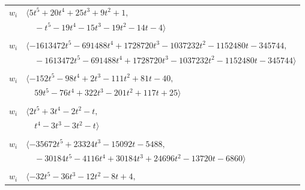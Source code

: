 \documentclass[11pt]{article}
\begin{document}
\begin{longtable}{@{}ll@{}}
$w_i$ & $\langle 5t^{5}+20t^{4}+25t^{3}+9t^{2}+1,$\\
 & $\quad -t^{5}-19t^{4}-15t^{3}-19t^{2}-14t-4\rangle$\\
\addlinespace[2pt]
\multicolumn{2}{@{}p{0.97\textwidth}@{}}{$i=11$, $D_i=19208$, $\rho_{ij}$: $4{:}2, \allowbreak 5{:}1, \allowbreak 9{:}1, \allowbreak 13{:}1, \allowbreak 19{:}1, \allowbreak 22{:}1, \allowbreak 23{:}1, \allowbreak 27{:}2, \allowbreak 28{:}2, \allowbreak 30{:}1, \allowbreak 35{:}1, \allowbreak 44{:}1, \allowbreak 45{:}1$}\\
$w_i$ & $\langle -1613472t^{5}-691488t^{4}+1728720t^{3}-1037232t^{2}-1152480t-345744,$\\
 & $\quad -1613472t^{5}-691488t^{4}+1728720t^{3}-1037232t^{2}-1152480t-345744\rangle$\\
\addlinespace[2pt]
\multicolumn{2}{@{}p{0.97\textwidth}@{}}{$i=12$, $D_i=1$, $\rho_{ij}$: $4{:}2, \allowbreak 5{:}2, \allowbreak 8{:}1, \allowbreak 9{:}2, \allowbreak 13{:}2, \allowbreak 25{:}2, \allowbreak 26{:}1, \allowbreak 27{:}1, \allowbreak 28{:}1, \allowbreak 40{:}1, \allowbreak 52{:}1$}\\
$w_i$ & $\langle -152t^{5}-98t^{4}+2t^{3}-111t^{2}+81t-40,$\\
 & $\quad 59t^{5}-76t^{4}+322t^{3}-201t^{2}+117t+25\rangle$\\
\addlinespace[2pt]
\multicolumn{2}{@{}p{0.97\textwidth}@{}}{$i=13$, $D_i=1$, $\rho_{ij}$: $11{:}2, \allowbreak 12{:}1, \allowbreak 19{:}2, \allowbreak 27{:}1, \allowbreak 34{:}1, \allowbreak 47{:}2$}\\
$w_i$ & $\langle 2t^{5}+3t^{4}-2t^{2}-t,$\\
 & $\quad t^{4}-3t^{3}-3t^{2}-t\rangle$\\
\addlinespace[2pt]
\multicolumn{2}{@{}p{0.97\textwidth}@{}}{$i=14$, $D_i=1372$, $\rho_{ij}$: $4{:}1, \allowbreak 5{:}2, \allowbreak 7{:}1, \allowbreak 10{:}2, \allowbreak 27{:}1, \allowbreak 28{:}2, \allowbreak 46{:}2, \allowbreak 47{:}2$}\\
$w_i$ & $\langle -35672t^{5}+23324t^{3}-15092t-5488,$\\
 & $\quad -30184t^{5}-4116t^{4}+30184t^{3}+24696t^{2}-13720t-6860\rangle$\\
\addlinespace[2pt]
\multicolumn{2}{@{}p{0.97\textwidth}@{}}{$i=15$, $D_i=4$, $\rho_{ij}$: $3{:}2, \allowbreak 6{:}2, \allowbreak 19{:}1, \allowbreak 24{:}1, \allowbreak 29{:}1, \allowbreak 34{:}2, \allowbreak 37{:}1, \allowbreak 43{:}2, \allowbreak 47{:}1, \allowbreak 54{:}1$}\\
$w_i$ & $\langle -32t^{5}-36t^{3}-12t^{2}-8t+4,$\\

\end{longtable}
\end{document}
